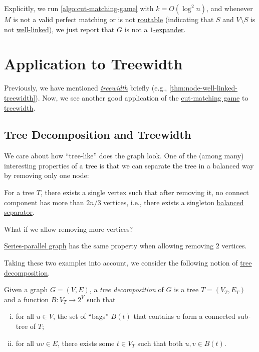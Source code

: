 \begin{note}
	Explicitly, we run \autoref{algo:cut-matching-game} with \(k = O(\log ^2 n)\), and whenever \(M\) is not a valid perfect matching or is not \hyperref[def:routable]{routable} (indicating that \(S\) and \(V\setminus S\) is not \hyperref[def:well-linked]{well-linked}), we just report that \(G\) is not a \hyperref[def:expander]{\(1\)-expander}.
\end{note}

\section{Application to Treewidth}
Previously, we have mentioned \emph{\hyperref[def:treewidth]{treewidth}} briefly (e.g., \autoref{thm:node-well-linked-treewidth}). Now, we see another good application of the \hyperref[def:cut-matching-game]{cut-matching game} to \hyperref[def:treewidth]{treewidth}.

\subsection{Tree Decomposition and Treewidth}
We care about how ``tree-like'' does the graph look. One of the (among many) interesting properties of a tree is that we can separate the tree in a balanced way by removing only one node:

\begin{eg}[Tree]
	For a tree \(T\), there exists a single vertex such that after removing it, no connect component has more than \(2 n/ 3\) vertices, i.e., there exists a singleton \hyperref[def:balanced-separator]{balanced separator}.
\end{eg}

What if we allow removing more vertices?

\begin{eg}
	\href{https://en.wikipedia.org/wiki/Series%E2%80%93parallel_graph}{Series-parallel graph} has the same property when allowing removing \(2\) vertices.
\end{eg}

Taking these two examples into account, we consider the following notion of \hyperref[def:tree-decomposition]{tree decomposition}.

\begin{definition}\label{def:tree-decomposition}
	Given a graph \(G = (V, E)\), a \emph{tree decomposition} of \(G\) is a tree \(T = (V_T, E_T)\) and a function \(B \colon V_T \to 2^V\) such that
	\begin{enumerate}[(i)]
		\item for all \(u \in V\), the set of ``bags'' \(B(t)\) that contains \(u\) form a connected sub-tree of \(T\);
		\item for all \(uv \in E\), there exists some \(t \in V_T\) such that both \(u, v \in B(t)\).
	\end{enumerate}
\end{definition}

